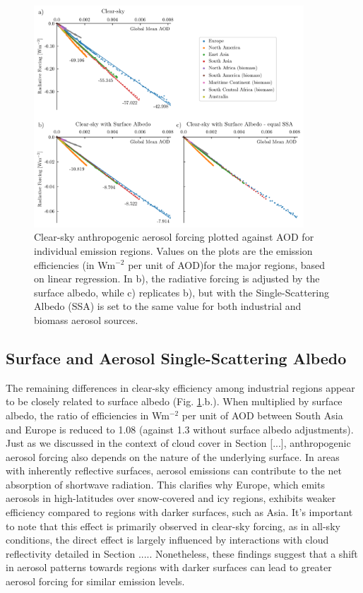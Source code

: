 \documentclass[draft]{agujournal2019}
\begin{document}
      \begin{figure}
            \centering
            \includegraphics[width=0.9\textwidth]{../../figures/figure4}
            \caption{Clear-sky anthropogenic aerosol forcing plotted against AOD for individual emission regions. Values on the plots are the emission efficiencies (in Wm$^{-2}$ per unit of AOD)for the major regions, based on linear regression. In b), the radiative forcing is adjusted by the surface albedo, while c) replicates b), but with the Single-Scattering Albedo (SSA) is set to the same value for both industrial and biomass aerosol sources.}
            \label{fig:figure4}
      \end{figure}

      \subsection{Surface and Aerosol Single-Scattering Albedo}

            The remaining differences in clear-sky efficiency among industrial regions appear to be closely related to surface albedo (Fig. \ref{fig:figure4}.b.). When multiplied by surface albedo, the ratio of efficiencies in Wm$^{-2}$ per unit of AOD between South Asia and Europe is reduced to 1.08 (against 1.3 without surface albedo adjustments). Just as we discussed in the context of cloud cover in Section [...], anthropogenic aerosol forcing also depends on the nature of the underlying surface. In areas with inherently reflective surfaces, aerosol emissions can contribute to the net absorption of shortwave radiation. This clarifies why Europe, which emits aerosols in high-latitudes over snow-covered and icy regions, exhibits weaker efficiency compared to regions with darker surfaces, such as Asia. It's important to note that this effect is primarily observed in clear-sky forcing, as in all-sky conditions, the direct effect is largely influenced by interactions with cloud reflectivity detailed in Section ..... Nonetheless, these findings suggest that a shift in aerosol patterns towards regions with darker surfaces can lead to greater aerosol forcing for similar emission levels.
            
\end{document}
